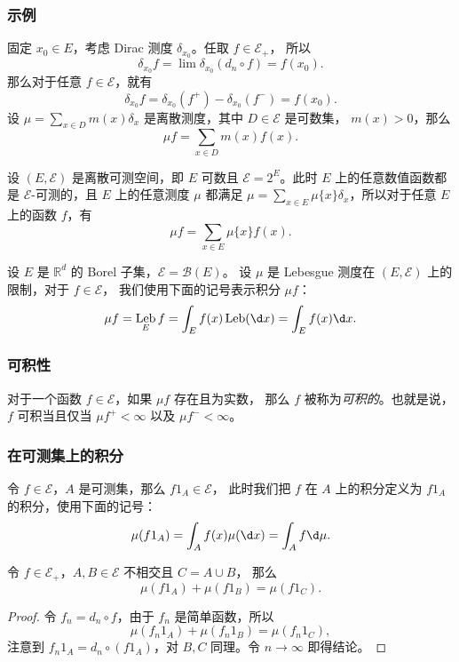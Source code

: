 \documentclass[fontset=none]{Notes}
\DeclareMathOperator\Leb{Leb}
\begin{document}
\subsubsection{示例}

\begin{example}[离散测度]
  固定 $x_0\in E$，考虑 Dirac 测度 $\delta_{x_0}$。任取 $f\in \mathcal{E}_+$，
  所以
  \[
    \delta_{x_0}f=\lim \delta_{x_0}(d_n\circ f)=  f(x_0).
  \]
  那么对于任意 $f\in \mathcal{E}$，就有
  \[
    \delta_{x_0}f=\delta_{x_0}(f^+)-\delta_{x_0}(f^-)=f(x_0).  
  \]
  设 $\mu=\sum_{x\in D} m(x)\delta_x$ 是离散测度，其中 $D\in \mathcal{E}$ 是可数集，
  $m(x)> 0$，那么
  \[
    \mu f=\sum_{x\in D}m(x) f(x).  
  \]
\end{example}

\begin{example}[离散空间]
  设 $(E,\mathcal{E})$ 是离散可测空间，即 $E$ 可数且 $\mathcal{E}=2^E$。此时
  $E$ 上的任意数值函数都是 $\mathcal{E}$-可测的，且 $E$ 上的任意测度 $\mu$ 都满足
  $\mu=\sum_{x\in E}\mu\{x\}\delta_x$，所以对于任意 $E$ 上的函数 $f$，有
  \[
    \mu f=\sum_{x\in E}\mu\{x\} f(x).
  \]
\end{example}

\begin{example}[Lebesgue 积分]
  设 $E$ 是 $\mathbb{R}^d$ 的 Borel 子集，$\mathcal{E}=\mathcal{B}(E)$。
  设 $\mu$ 是 Lebesgue 测度在 $(E,\mathcal{E})$ 上的限制，对于 $f\in \mathcal{E}$，
  我们使用下面的记号表示积分 $\mu f$：
  \[
    \mu f=\Leb_E f=\int_E f(x)\Leb(\d x)=\int_E f(x)\d x.  
  \]
\end{example}

\subsubsection{可积性}

对于一个函数 $f\in \mathcal{E}$，如果 $\mu f$ 存在且为实数，
那么 $f$ 被称为\emph{可积的}。也就是说，$f$ 可积当且仅当 
$\mu f^+<\infty$ 以及 $\mu f^-<\infty$。

\subsubsection{在可测集上的积分}

令 $f\in \mathcal{E}$，$A$ 是可测集，那么 $f1_A\in \mathcal{E}$，
此时我们把 $f$ 在 $A$ 上的积分定义为 $f1_A$ 的积分，使用下面的记号：
\[
  \mu(f1_A)=\int_A f(x)\mu(\d x)=\int_A f \d\mu.  
\]

\begin{lemma}
  令 $f\in \mathcal{E}_+$，$A,B\in \mathcal{E}$ 不相交且 $C=A\cup B$，
  那么
  \[
    \mu(f1_A)+\mu(f1_B)=\mu(f1_C).  
  \]
\end{lemma}
\begin{proof}
  令 $f_n=d_n\circ f$，由于 $f_n$ 是简单函数，所以
  \[
    \mu(f_n1_A)+\mu(f_n1_B)=\mu(f_n1_C),  
  \]
  注意到 $f_n1_A=d_n\circ(f1_A)$，对 $B,C$ 同理。令 $n\to\infty$ 即得结论。
\end{proof}
\end{document}
